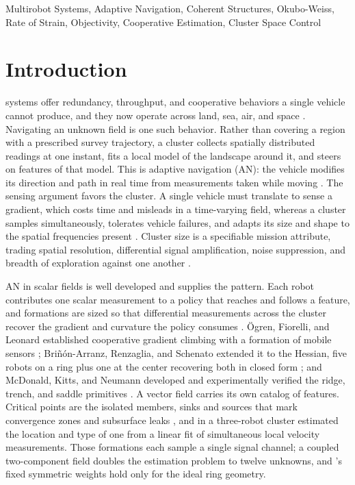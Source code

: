 \documentclass[lettersize,journal]{IEEEtran}
\begin{document}
\begin{IEEEkeywords}
Multirobot Systems, Adaptive Navigation, Coherent Structures,
Okubo-Weiss, Rate of Strain, Objectivity, Cooperative
Estimation, Cluster Space Control
\end{IEEEkeywords}

\section{Introduction}

 systems offer redundancy, throughput, and
cooperative behaviors a single vehicle cannot produce, and they now
operate across land, sea, air, and space \cite{1}. Navigating an
unknown field is one such behavior. Rather than covering a region with
a prescribed survey trajectory, a cluster collects spatially
distributed readings at one instant, fits a local model of the
landscape around it, and steers on features of that model. This is
adaptive navigation (AN): the vehicle modifies its direction and path
in real time from measurements taken while moving \cite{2}. The sensing
argument favors the cluster. A single vehicle must translate to sense a
gradient, which costs time and misleads in a time-varying field,
whereas a cluster samples simultaneously, tolerates vehicle failures,
and adapts its size and shape to the spatial frequencies present
\cite{2,3}. Cluster size is a specifiable mission attribute, trading
spatial resolution, differential signal amplification, noise
suppression, and breadth of exploration against one another \cite{4}.

AN in scalar fields is well developed and supplies the pattern. Each
robot contributes one scalar measurement to a policy that reaches and
follows a feature, and formations are sized so that differential
measurements across the cluster recover the gradient and curvature the
policy consumes \cite{4,5}. \"{O}gren, Fiorelli, and Leonard
established cooperative gradient climbing with a formation of mobile
sensors \cite{5}; Bri\~{n}\'{o}n-Arranz, Renzaglia, and Schenato
extended it to the Hessian, five robots on a ring plus one at the
center recovering both in closed form \cite{4}; and McDonald, Kitts,
and Neumann developed and experimentally verified the ridge, trench,
and saddle primitives \cite{2,3,6}. A vector field carries its own
catalog of features. Critical points are the isolated members, sinks
and sources that mark convergence zones and subsurface leaks
\cite{7}, and in \cite{8} a three-robot cluster estimated the location
and type of one from a linear fit of simultaneous local velocity
measurements. Those
formations each sample a single signal channel; a coupled
two-component field doubles the estimation problem to twelve unknowns,
and \cite{4}'s fixed symmetric weights hold only for the ideal ring
geometry.
\end{document}
